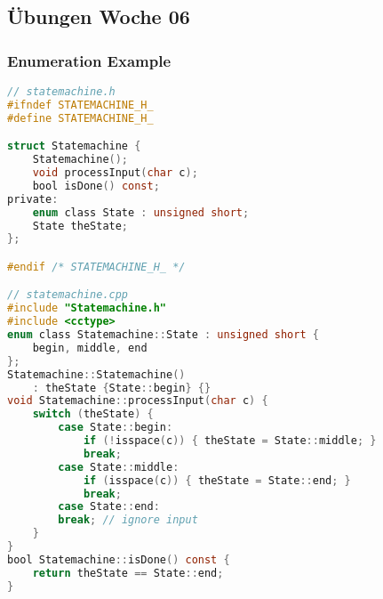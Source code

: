 

\subsection{Übungen Woche 06}
\subsubsection{Enumeration Example}
\begin{lstlisting}[style=frame, style= linenumbers, language=C]
// statemachine.h
#ifndef STATEMACHINE_H_
#define STATEMACHINE_H_

struct Statemachine {
    Statemachine();
    void processInput(char c);
    bool isDone() const;
private:
    enum class State : unsigned short;
    State theState;
};

#endif /* STATEMACHINE_H_ */

// statemachine.cpp
#include "Statemachine.h"
#include <cctype>
enum class Statemachine::State : unsigned short {
    begin, middle, end
};
Statemachine::Statemachine()
    : theState {State::begin} {}
void Statemachine::processInput(char c) {
    switch (theState) {
        case State::begin:
            if (!isspace(c)) { theState = State::middle; }
            break;
        case State::middle:
            if (isspace(c)) { theState = State::end; }
            break;
        case State::end:
        break; // ignore input
    }
}
bool Statemachine::isDone() const {
    return theState == State::end;
}
\end{lstlisting}